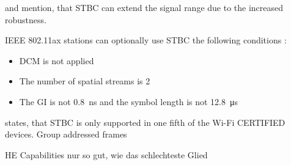 \textcite{gast_80211n_nodate} and \textcite{sauter_wireless_2022} mention, that \ac{STBC} can extend the signal range due to the increased robustness.

IEEE 802.11ax stations can optionally use \ac{STBC} the following conditions \cite{noauthor_ieee_2021}:
\begin{itemize}
	\item DCM is not applied
	\item The number of spatial streams is \num{2}
	\item The \ac{GI} is not \SI{0.8}{\nano\second} and the symbol length is not \SI{12.8}{\micro\second}
\end{itemize}




\cite{gast_80211n_nodate} states, that \ac{STBC} is only supported in one fifth of the Wi-Fi CERTIFIED devices.
Group addressed frames


HE Capabilities nur so gut, wie das schlechteste Glied